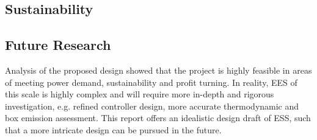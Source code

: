 \documentclass[11pt,oneside]{article}
\begin{document}
\subsection{Sustainability}
\subsection{Future Research}
\noindent Analysis of the proposed design showed that the project is highly feasible in areas of meeting power demand, sustainability and profit turning. In reality, EES of this scale is highly complex and will require more in-depth and rigorous investigation, e.g. refined controller design, more accurate thermodynamic and box emission assessment. This report offers an idealistic design draft of ESS, such that a more intricate design can be pursued in the future.
\end{document}
